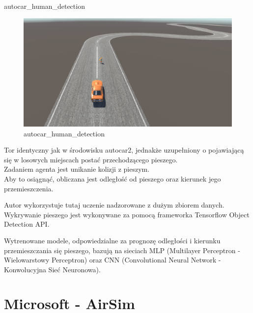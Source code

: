 \begin{itemize*}
\item autocar\_human\_detection \\
\begin{figure}[H]
\begin{center}
\includegraphics[width=15cm]{resources/figures/autocar_human.png}
\caption{autocar\_human\_detection}
\end{center}
\end{figure}
\label{Autocar_human}
Tor identyczny jak w środowisku autocar2, jednakże uzupełniony o pojawiającą się w losowych miejscach postać przechodzącego pieszego.\\
Zadaniem agenta jest unikanie kolizji z pieszym. \\
Aby to osiągnąć, obliczana jest odległość od pieszego oraz kierunek jego przemieszczenia.

Autor wykorzystuje tutaj uczenie nadzorowane z dużym zbiorem danych.
Wykrywanie pieszego jest wykonywane za pomocą frameworka 
Tensorflow Object Detection API.

Wytrenowane modele, odpowiedzialne za prognozę odległości i kierunku przemieszczania się pieszego, bazują na sieciach 
MLP (Multilayer Perceptron - Wielowarstowy Perceptron) oraz 
CNN (Convolutional Neural Network - Konwolucyjna Sieć Neuronowa).
\end{itemize*}

\newpage
\section{Microsoft - AirSim}